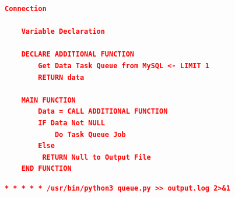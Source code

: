 			\begin{lstlisting}[frame=single,tabsize=2,breaklines,caption={Konfigurasi docker-compose.yml },label=taskqueue, captionpos=b, language=json]
	Connection
	
	Variable Declaration

	DECLARE ADDITIONAL FUNCTION
		Get Data Task Queue from MySQL <- LIMIT 1
		RETURN data
	
	MAIN FUNCTION
		Data = CALL ADDITIONAL FUNCTION
		IF Data Not NULL
			Do Task Queue Job
		Else
		 RETURN Null to Output File
	END FUNCTION
			\end{lstlisting}
			
			\begin{lstlisting}[frame=single,tabsize=2,breaklines,caption={Konfigurasi docker-compose.yml },label=crontab, captionpos=b, language=json]
	* * * * * /usr/bin/python3 queue.py >> output.log 2>&1
			\end{lstlisting}
